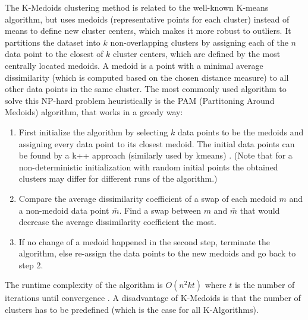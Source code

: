 
The K-Medoids clustering method is related to the well-known K-means algorithm, but uses medoids (representative points for each cluster) instead of means to define new cluster centers, which makes it more robust to outliers\cite{Jin2010}. It partitions the dataset into $k$ non-overlapping clusters by assigning each of the $n$ data point to the closest of $k$ cluster centers, which are defined by the most centrally located medoids. A medoid is a point with a minimal average dissimilarity (which is computed based on the chosen distance measure) to all other data points in the same cluster. The most commonly used algorithm to solve this NP-hard problem heuristically is the PAM (Partitoning Around Medoids) algorithm, that works in a greedy way: \cite{kaufman2009finding} \\
\begin{enumerate}
	\item First initialize the algorithm by selecting $k$ data points to be the medoids and assigning every data point to its closest medoid. The initial data points can be found by a k++ approach (similarly used by kmeans) \cite{scikit-learn-extra}. (Note that for a non-deterministic initialization with random initial points the obtained clusters may differ for different runs of the algorithm.) \\
	\item Compare the average dissimilarity coefficient of a swap of each medoid $m$ and a non-medoid data point $\bar{m}$. Find a swap between $m$ and $\bar{m}$ that would decrease the average dissimilarity coefficient the most. 
	\item If no change of a medoid happened in the second step, terminate the algorithm, else re-assign the data points to the new medoids and go back to step 2. 
\end{enumerate}

The runtime complexity of the algorithm is $O(n^2kt)$ where $t$ is the number of iterations until convergence  \cite{scikit-learn-extra}. A disadvantage of K-Medoids is that the number of clusters has to be predefined (which is the case for all K-Algorithms). 